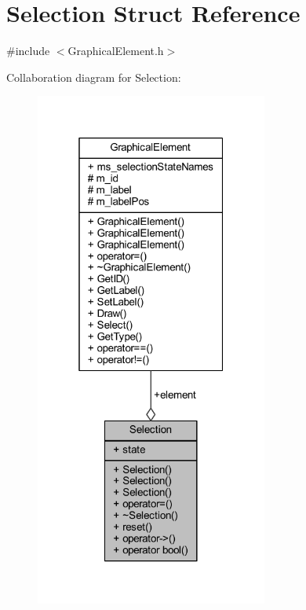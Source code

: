 \hypertarget{struct_selection}{}\section{Selection Struct Reference}
\label{struct_selection}


{\ttfamily \#include $<$Graphical\+Element.\+h$>$}



Collaboration diagram for Selection\+:
\nopagebreak
\begin{figure}[H]
\begin{center}
\leavevmode
\includegraphics[width=217pt]{struct_selection__coll__graph}
\end{center}
\end{figure}
